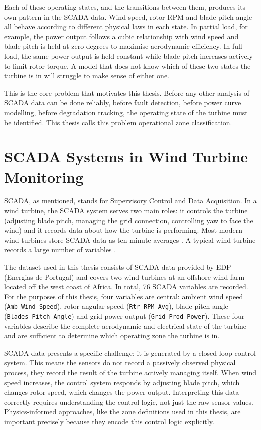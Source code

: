 Each of these operating states, and the transitions between them, produces its own
pattern in the SCADA data. Wind speed, rotor RPM and blade pitch angle all behave
according to different physical laws in each state. In partial load, for example, the
power output follows a cubic relationship with wind speed and blade pitch is held at
zero degrees to maximise aerodynamic efficiency. In full load, the same power output
is held constant while blade pitch increases actively to limit rotor torque. A model
that does not know which of these two states the turbine is in will struggle to make
sense of either one.

This is the core problem that motivates this thesis. Before any other analysis of
SCADA data can be done reliably, before fault detection, before power curve modelling,
before degradation tracking, the operating state of the turbine must be identified.
This thesis calls this problem operational zone classification.

\section{SCADA Systems in Wind Turbine Monitoring}
\label{sec:intro:scada}

SCADA, as mentioned, stands for Supervisory Control and Data Acquisition. In a wind
turbine, the SCADA system serves two main roles: it controls the turbine (adjusting blade
pitch, managing the grid connection, controlling yaw to face the wind) and it records data
about how the turbine is performing. Most modern wind turbines store SCADA data as ten-minute averages \citep{pandit2024}.
A typical wind turbine records a large number of variables \citep{pandit2024, pandit2019}.

The dataset used in this thesis consists of SCADA data provided by EDP (Energias de
Portugal) and covers two wind turbines at an offshore wind farm located off the west
coast of Africa. In total, 76 SCADA
variables are recorded. For the purposes of this thesis, four variables are central:
ambient wind speed (\texttt{Amb\_Wind\_Speed}), rotor angular speed
(\texttt{Rtr\_RPM\_Avg}), blade pitch angle (\texttt{Blades\_Pitch\_Angle}) and grid
power output (\texttt{Grid\_Prod\_Power}). These four variables describe the complete
aerodynamic and electrical state of the turbine and are sufficient to determine which
operating zone the turbine is in.

SCADA data presents a specific challenge: it is generated by a closed-loop control system.
This means the sensors do not record a passively observed physical process, they record
the result of the turbine actively managing itself. When wind speed increases, the control
system responds by adjusting blade pitch, which changes rotor speed, which changes the
power output. Interpreting this data correctly requires understanding the control logic,
not just the raw sensor values. Physics-informed approaches, like the zone definitions
used in this thesis, are important precisely because they encode this control logic
explicitly.


